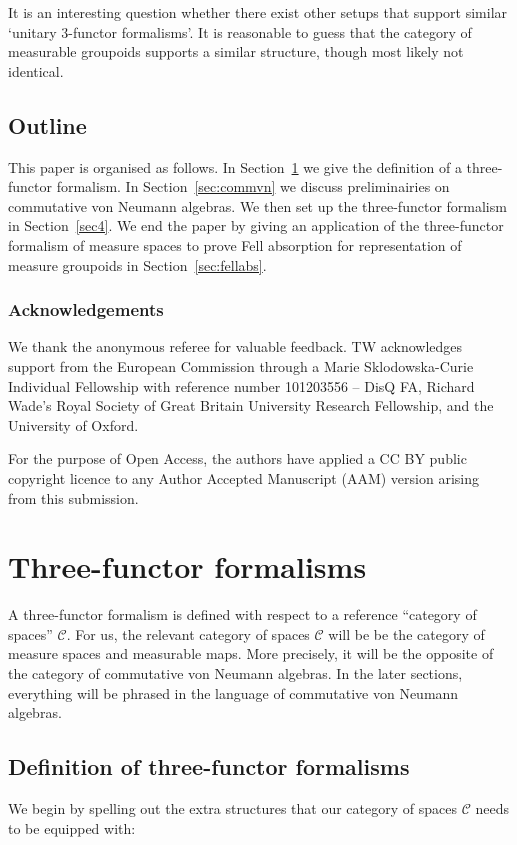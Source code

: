 \documentclass[10pt,a4paper,oneside]{amsart}
\theoremstyle{remark}
\theoremstyle{definition}
\begin{document}
It is an interesting question whether there exist other setups that support similar `unitary $3$-functor formalisms'. It is reasonable to guess that the category of measurable groupoids supports a similar structure, though most likely not identical.



\subsection{Outline}
This paper is organised as follows. In Section~\ref{sec:threeff} we give the definition of a three-functor formalism. In Section~\ref{sec:commvn} we discuss preliminairies on commutative von Neumann algebras. We then set up the three-functor formalism in Section~\ref{sec4}. We end the paper by giving an application of the three-functor formalism of measure spaces to prove Fell absorption for representation of measure groupoids in Section~\ref{sec:fellabs}.


\subsubsection*{Acknowledgements}
We thank the anonymous referee for valuable feedback. TW acknowledges support from the European Commission through a Marie Sklodowska-Curie Individual Fellowship with reference number 101203556 -- DisQ FA, Richard Wade's Royal Society of Great Britain University Research Fellowship, and the University of Oxford.

\bigskip

{\small {} For the purpose of Open Access, the authors have applied a CC BY public copyright
licence to any Author Accepted Manuscript (AAM) version arising from this submission.}


\section{Three-functor formalisms}\label{sec:threeff}

A three-functor formalism is defined with respect to a reference ``category of spaces'' $\mathcal{C}$. 
For us, the relevant category of spaces $\mathcal{C}$ will be be the category of measure spaces and measurable maps. More precisely, it will be the opposite of the category of commutative von Neumann algebras.
In the later sections, everything will be phrased in the language of commutative von Neumann algebras.

\subsection{Definition of three-functor formalisms}
We begin by spelling out the extra structures that our category of spaces $\mathcal C$ needs to be equipped with:
\end{document}
